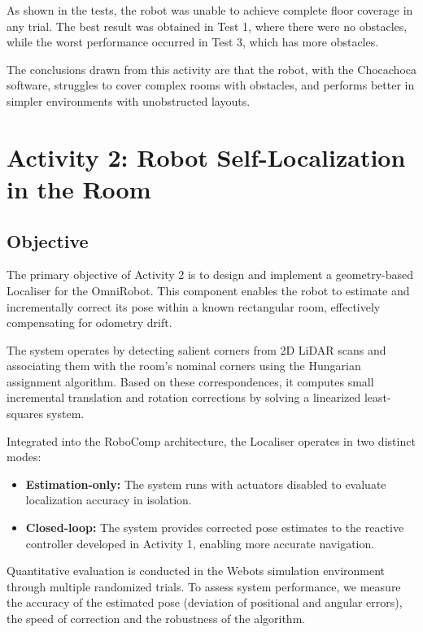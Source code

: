 \documentclass[conference]{IEEEtran}
\begin{document}
As shown in the tests, the robot was unable to achieve complete floor coverage in any trial. The best result was obtained in Test 1, where there were no obstacles, while the worst performance occurred in Test 3, which has more obstacles.

The conclusions drawn from this activity are that the robot, with the Chocachoca software, struggles to cover complex rooms with obstacles, and performs better in simpler environments with unobstructed layouts.

\section{Activity 2: Robot Self-Localization in the Room}

\subsection{Objective}
The primary objective of Activity 2 is to design and implement a geometry-based Localiser for the OmniRobot. This component enables the robot to estimate and incrementally correct its pose within a known rectangular room, effectively compensating for odometry drift.

The system operates by detecting salient corners from 2D LiDAR scans and associating them with the room’s nominal corners using the Hungarian assignment algorithm. Based on these correspondences, it computes small incremental translation and rotation corrections by solving a linearized least-squares system.

Integrated into the RoboComp architecture, the Localiser operates in two distinct modes:
\begin{itemize}
    \item \textbf{Estimation-only:} The system runs with actuators disabled to evaluate localization accuracy in isolation.
    \item \textbf{Closed-loop:} The system provides corrected pose estimates to the reactive controller developed in Activity 1, enabling more accurate navigation.
\end{itemize}

Quantitative evaluation is conducted in the Webots simulation environment through multiple randomized trials. To assess system performance, we measure the accuracy of the estimated pose (deviation of positional and angular errors), the speed of correction  and the robustness of the algorithm.
\end{document}
